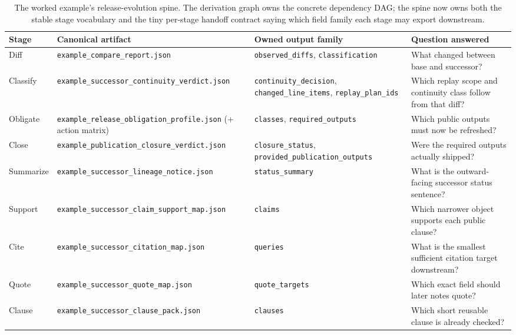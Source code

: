 \documentclass[11pt]{article}
\begin{document}
\begin{table}[t]
\centering
\small
\begin{tabularx}{\linewidth}{@{}Y Y Y Y@{}}
\toprule
Stage & Canonical artifact & Owned output family & Question answered \\
\midrule
Diff & \texttt{example\_compare\_report.json} & \texttt{observed\_diffs}, \texttt{classification} & What changed between base and successor? \\
Classify & \texttt{example\_successor\_continuity\_verdict.json} & \texttt{continuity\_decision}, \texttt{changed\_line\_items}, \texttt{replay\_plan\_ids} & Which replay scope and continuity class follow from that diff? \\
Obligate & \texttt{example\_release\_obligation\_profile.json} (+ action matrix) & \texttt{classes}, \texttt{required\_outputs} & Which public outputs must now be refreshed? \\
Close & \texttt{example\_publication\_closure\_verdict.json} & \texttt{closure\_status}, \texttt{provided\_publication\_outputs} & Were the required outputs actually shipped? \\
Summarize & \texttt{example\_successor\_lineage\_notice.json} & \texttt{status\_summary} & What is the outward-facing successor status sentence? \\
Support & \texttt{example\_successor\_claim\_support\_map.json} & \texttt{claims} & Which narrower object supports each public clause? \\
Cite & \texttt{example\_successor\_citation\_map.json} & \texttt{queries} & What is the smallest sufficient citation target downstream? \\
Quote & \texttt{example\_successor\_quote\_map.json} & \texttt{quote\_targets} & Which exact field should later notes quote? \\
Clause & \texttt{example\_successor\_clause\_pack.json} & \texttt{clauses} & Which short reusable clause is already checked? \\
\bottomrule
\end{tabularx}
\caption{The worked example's release-evolution spine. The derivation graph owns the concrete dependency DAG; the spine now owns both the stable stage vocabulary and the tiny per-stage handoff contract saying which field family each stage may export downstream.}
\label{tab:release-spine}
\end{table}
\end{document}
